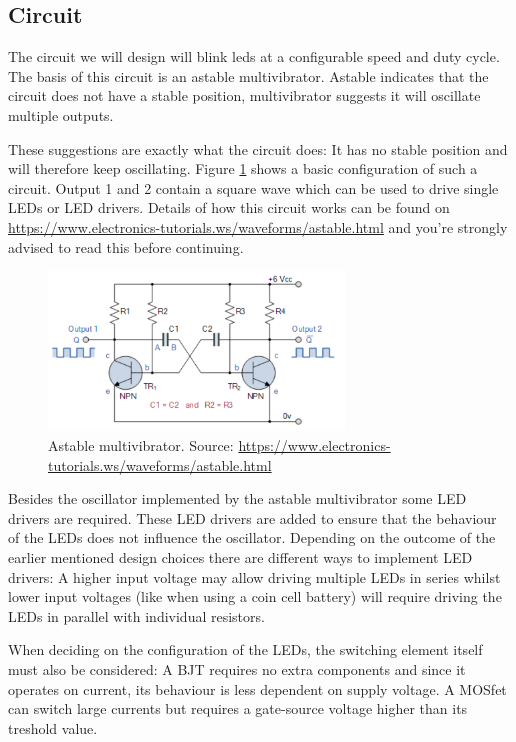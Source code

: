 \documentclass[12pt]{article}
\begin{document}
\subsection{Circuit}

The circuit we will design will blink leds at a configurable speed and duty cycle. The basis of this circuit is an astable multivibrator.
Astable indicates that the circuit does not have a stable position, multivibrator suggests it will oscillate multiple outputs.

These suggestions are exactly what the circuit does: It has no stable position and will therefore keep oscillating.
Figure \ref{fig:astablemultivibrator} shows a basic configuration of such a circuit. Output 1 and 2 contain a square wave which can be used to drive single LEDs or LED drivers. Details of how this circuit works can be found on \url{https://www.electronics-tutorials.ws/waveforms/astable.html} and you're strongly advised to read this before continuing.

\begin{figure}[H]
	\centering
	\includegraphics[width=0.7\textwidth]{../images/astablemultivibrator.png}
	\caption{Astable multivibrator. Source: \url{https://www.electronics-tutorials.ws/waveforms/astable.html}}
	\label{fig:astablemultivibrator}
\end{figure}

Besides the oscillator implemented by the astable multivibrator some LED drivers are required. These LED drivers are added to ensure that the behaviour of the LEDs does not influence the oscillator.
Depending on the outcome of the earlier mentioned design choices there are different ways to implement LED drivers: A higher input voltage may allow driving multiple LEDs in series whilst lower input voltages (like when using a coin cell battery) will require driving the LEDs in parallel with individual resistors.

When deciding on the configuration of the LEDs, the switching element itself must also be considered:
A BJT requires no extra components and since it operates on current, its behaviour is less dependent on supply voltage. A MOSfet can switch large currents but requires a gate-source voltage higher than its treshold value.
\end{document}
